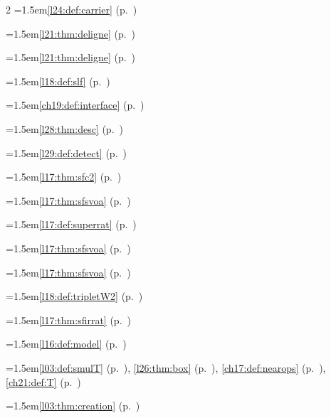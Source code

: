 \begin{multicols}{2}
\hangindent=1.5em\quad \ref{l24:def:carrier} (p.~\pageref{l24:def:carrier})\par
\hangindent=1.5em\quad \ref{l21:thm:deligne} (p.~\pageref{l21:thm:deligne})\par
\hangindent=1.5em\quad \ref{l21:thm:deligne} (p.~\pageref{l21:thm:deligne})\par
\hangindent=1.5em\quad \ref{l18:def:slf} (p.~\pageref{l18:def:slf})\par
\hangindent=1.5em\quad \ref{ch19:def:interface} (p.~\pageref{ch19:def:interface})\par
\hangindent=1.5em\quad \ref{l28:thm:desc} (p.~\pageref{l28:thm:desc})\par
\hangindent=1.5em\quad \ref{l29:def:detect} (p.~\pageref{l29:def:detect})\par
\hangindent=1.5em\quad \ref{l17:thm:sfc2} (p.~\pageref{l17:thm:sfc2})\par
\hangindent=1.5em\quad \ref{l17:thm:sfsvoa} (p.~\pageref{l17:thm:sfsvoa})\par
\hangindent=1.5em\quad \ref{l17:def:superrat} (p.~\pageref{l17:def:superrat})\par
\hangindent=1.5em\quad \ref{l17:thm:sfsvoa} (p.~\pageref{l17:thm:sfsvoa})\par
\hangindent=1.5em\quad \ref{l17:thm:sfsvoa} (p.~\pageref{l17:thm:sfsvoa})\par
\hangindent=1.5em\quad \ref{l18:def:tripletW2} (p.~\pageref{l18:def:tripletW2})\par
\hangindent=1.5em\quad \ref{l17:thm:sfirrat} (p.~\pageref{l17:thm:sfirrat})\par
\hangindent=1.5em\quad \ref{l16:def:model} (p.~\pageref{l16:def:model})\par
\par{}\par\nopagebreak\smallskip
\hangindent=1.5em\quad \ref{l03:def:smulT} (p.~\pageref{l03:def:smulT}), \ref{l26:thm:box} (p.~\pageref{l26:thm:box}), \ref{ch17:def:nearops} (p.~\pageref{ch17:def:nearops}), \ref{ch21:def:T} (p.~\pageref{ch21:def:T})\par
\hangindent=1.5em\quad \ref{l03:thm:creation} (p.~\pageref{l03:thm:creation})\par

\end{multicols}
